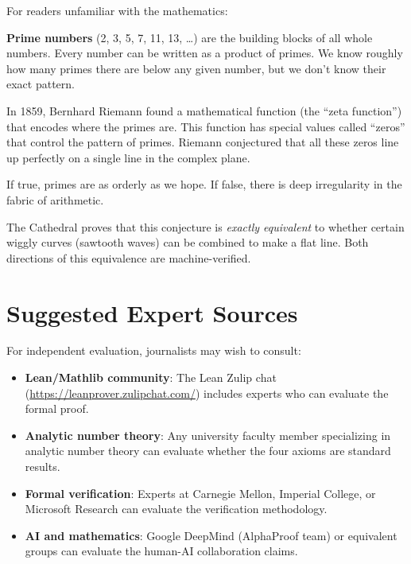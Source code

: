 \documentclass[11pt,a4paper]{article}
\begin{document}
For readers unfamiliar with the mathematics:

\textbf{Prime numbers} (2, 3, 5, 7, 11, 13, \ldots) are the
building blocks of all whole numbers. Every number can be written
as a product of primes. We know roughly how many primes there are
below any given number, but we don't know their exact pattern.

In 1859, Bernhard Riemann found a mathematical function (the
``zeta function'') that encodes where the primes are. This function
has special values called ``zeros'' that control the pattern of
primes. Riemann conjectured that all these zeros line up perfectly
on a single line in the complex plane.

If true, primes are as orderly as we hope. If false, there is
deep irregularity in the fabric of arithmetic.

The Cathedral proves that this conjecture is \emph{exactly
equivalent} to whether certain wiggly curves (sawtooth waves) can
be combined to make a flat line. Both directions of this equivalence
are machine-verified.

\section{Suggested Expert Sources}

For independent evaluation, journalists may wish to consult:

\begin{itemize}
  \item \textbf{Lean/Mathlib community}: The Lean Zulip chat
    (\url{https://leanprover.zulipchat.com/}) includes experts
    who can evaluate the formal proof.

  \item \textbf{Analytic number theory}: Any university faculty
    member specializing in analytic number theory can evaluate
    whether the four axioms are standard results.

  \item \textbf{Formal verification}: Experts at Carnegie Mellon,
    Imperial College, or Microsoft Research can evaluate the
    verification methodology.

  \item \textbf{AI and mathematics}: Google DeepMind (AlphaProof
    team) or equivalent groups can evaluate the human-AI
    collaboration claims.
\end{itemize}
\end{document}
